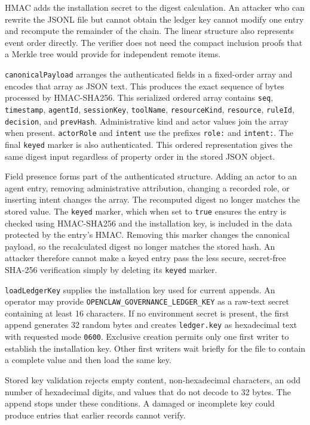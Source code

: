 HMAC adds the installation secret to the digest calculation. An attacker who can rewrite the JSONL file but cannot obtain the ledger key cannot modify one entry and recompute the remainder of the chain. The linear structure also represents event order directly. The verifier does not need the compact inclusion proofs that a Merkle tree would provide for independent remote items.

\texttt{canonicalPayload} arranges the authenticated fields in a fixed-order array and encodes that array as JSON text. This produces the exact sequence of bytes processed by HMAC-SHA256. This serialized ordered array contains \texttt{seq}, \texttt{timestamp}, \texttt{agentId}, \texttt{sessionKey}, \texttt{toolName}, \texttt{resourceKind}, \texttt{resource}, \texttt{ruleId}, \texttt{decision}, and \texttt{prevHash}. Administrative kind and actor values join the array when present. \texttt{actorRole} and \texttt{intent} use the prefixes \texttt{role:} and \texttt{intent:}. The final \texttt{keyed} marker is also authenticated. This ordered representation gives the same digest input regardless of property order in the stored JSON object.

Field presence forms part of the authenticated structure. Adding an actor to an agent entry, removing administrative attribution, changing a recorded role, or inserting intent changes the array. The recomputed digest no longer matches the stored value. The \texttt{keyed} marker, which when set to \texttt{true} ensures the entry is checked using HMAC-SHA256 and the installation key, is included in the data protected by the entry's HMAC. Removing this marker changes the canonical payload, so the recalculated digest no longer matches the stored hash. An attacker therefore cannot make a keyed entry pass the less secure, secret-free SHA-256 verification simply by deleting its \texttt{keyed} marker.

\texttt{loadLedgerKey} supplies the installation key used for current appends. An operator may provide \texttt{OPENCLAW\_GOVERNANCE\_LEDGER\_KEY} as a raw-text secret containing at least 16 characters. If no environment secret is present, the first append generates 32 random bytes and creates \texttt{ledger.key} as hexadecimal text with requested mode \texttt{0600}. Exclusive creation permits only one first writer to establish the installation key. Other first writers wait briefly for the file to contain a complete value and then load the same key.

Stored key validation rejects empty content, non-hexadecimal characters, an odd number of hexadecimal digits, and values that do not decode to 32 bytes. The append stops under these conditions. A damaged or incomplete key could produce entries that earlier records cannot verify.

